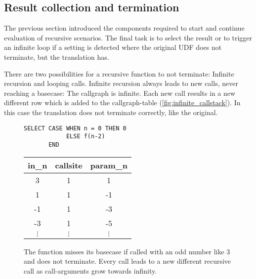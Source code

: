 \FloatBarrier
\subsection{Result collection and termination}

The previous section introduced the components required to start and continue evaluation of recursive scenarios. The final task is to select the result or to trigger an infinite loop if a setting is detected where the original UDF does not terminate, but the translation has.

There are two possibilities for a recursive function to not terminate: Infinite recursion and looping calls. Infinite recursion always leads to new calls, never reaching a basecase: The callgraph is infinite. Each new call results in a new different row which is added to the callgraph-table (\autoref{fig:infinite_callstack}). In this case the translation does not terminate correctly, like the original.

\begin{figure}[h!]\small
    \begin{minipage}[b]{.5\linewidth}
    \centering
    \begin{verbatim}
SELECT CASE WHEN n = 0 THEN 0
            ELSE f(n-2)
       END
    \end{verbatim}
    \label{fig:infinite_callstack_udf}\par\vfill
    \end{minipage}%
    \begin{minipage}[b]{.5\linewidth}
    \centering
    \begin{tabular}{c|c|c}
in\_n & callsite & param\_n \\\hline
3  & 1 &  1 \\
1  & 1 & -1 \\
-1 & 1 & -3 \\
-3 & 1 & -5 \\
$\vdots$ & $\vdots$ & $\vdots$
    \end{tabular}
    \label{fig:infinite_callstack_callstack}
    \end{minipage}
    \caption{The function misses its basecase if called with an odd number like 3 and does not terminate. Every call leads to a new different recursive call as call-arguments grow towards infinity.}\label{fig:infinite_callstack}
\end{figure}

